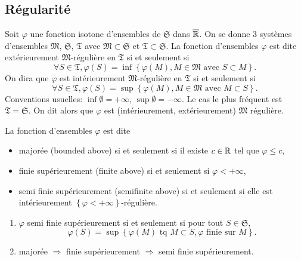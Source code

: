 \subsection{Régularité} \label{Regularite}
Soit $\varphi$ une fonction isotone d'ensembles de $\mathfrak{S}$ dans $\overline{\mathbb{R}}$.\newline
On se donne 3 systèmes d'ensembles $\mathfrak{M}$, $\mathfrak{S}$, $\mathfrak{T}$ avec $\mathfrak{M} \subset \mathfrak{S}$ et $\mathfrak{T} \subset \mathfrak{S}$. La fonction d'ensembles $\varphi$ est dite extérieurement $\mathfrak{M}$-régulière en $\mathfrak{T}$ si et seulement si
\begin{displaymath}
 \forall S \in \mathfrak{T}, \varphi(S) = \inf\left\lbrace \varphi(M), M \in \mathfrak{M} \text{ avec } S \subset M\right\rbrace.
\end{displaymath}
On dira que $\varphi$ est intérieurement $\mathfrak{M}$-régulière en $\mathfrak{T}$ si et seulement si
\begin{displaymath}
 \forall S \in \mathfrak{T}, \varphi(S) = \sup\left\lbrace \varphi(M), M \in \mathfrak{M} \text{ avec } M \subset S\right\rbrace.
\end{displaymath}
Conventions usuelles: $\inf \emptyset = + \infty$, $\sup \emptyset = - \infty$.\newline
Le cas le plus fréquent est $\mathfrak{T} = \mathfrak{S}$. On dit alors que $\varphi$ est (intérieurement, extérieurement) $\mathfrak{M}$ régulière.

La fonction d'ensembles $\varphi$ est dite
\begin{itemize}
 \item majorée (bounded above) si et seulement si il existe $c\in \mathbb{R}$ tel que $\varphi \leq c$,
 \item finie supérieurement (finite above) si et seulement si $\varphi < +\infty$,
 \item semi finie supérieurement (semifinite above) si et seulement si elle est intérieurement $\left\lbrace \varphi < + \infty\right\rbrace$-régulière.
\end{itemize}
\begin{rems}
 \begin{enumerate}
  \item $\varphi$ semi finie supérieurement si et seulement si pour tout $S \in \mathfrak{S}$,
  \begin{displaymath}
   \varphi(S) = \sup\left\lbrace \varphi(M)\text{ tq } M \subset S, \varphi \text{ finie sur } M \right\rbrace.
  \end{displaymath}
  \item majorée $\Rightarrow$ finie supérieurement $\Rightarrow$ semi finie supérieurement.
 \end{enumerate}
\end{rems}


